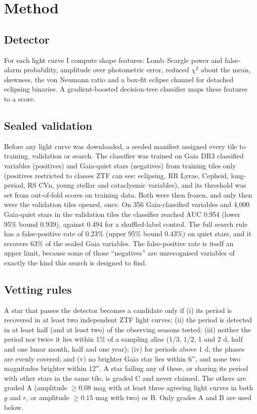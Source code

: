\documentclass[twocolumn]{searchchev_preprint}
\begin{document}
\section{Method}
\subsection{Detector}
For each light curve I compute shape features: Lomb--Scargle \citep{Lomb1976,Scargle1982} power and false-alarm
probability, amplitude over photometric error, reduced $\chi^2$ about the mean, skewness, the von Neumann ratio and a
box-fit eclipse channel for detached eclipsing binaries. A gradient-boosted decision-tree classifier maps these features
to a score.

\subsection{Sealed validation}
Before any light curve was downloaded, a seeded manifest assigned every tile to training, validation or search. The
classifier was trained on Gaia DR3 classified variables (positives) and Gaia-quiet stars (negatives) from training
tiles only (positives restricted to classes ZTF can see: eclipsing, RR Lyrae, Cepheid, long-period, RS CVn, young
stellar and cataclysmic variables), and its threshold was set from out-of-fold scores on training data. Both were then frozen, and only then
were the validation tiles opened, once. On 356 Gaia-classified variables and 4,000 Gaia-quiet stars in the validation
tiles the classifier reached AUC 0.954 (lower 95\% bound 0.939), against 0.494 for a shuffled-label control. The full
search rule has a false-positive rate of 0.23\% (upper 95\% bound 0.43\%) on quiet stars, and it recovers 63\% of the sealed Gaia variables. The false-positive rate is itself an upper limit,
because some of those ``negatives'' are unrecognised variables of exactly the kind this search is designed to find.

\subsection{Vetting rules}
A star that passes the detector becomes a candidate only if (i) its period is recovered in at least two independent ZTF
light curves; (ii) the period is detected in at least half (and at least two) of the observing seasons tested;
(iii) neither the period nor twice it lies within 1\% of a sampling alias (1/3, 1/2, 1 and 2 d, half and one lunar
month, half and one year); (iv) for periods above 1 d, the phases are evenly covered; and (v) no brighter Gaia star
lies within $6''$, and none two magnitudes brighter within $12''$. A star failing any of these, or sharing its period
with other stars in the same tile, is graded C and never claimed. The others are graded A (amplitude $\ge0.08$ mag
with at least three agreeing light curves in both $g$ and $r$, or amplitude $\ge0.15$ mag with two) or B. Only grades A
and B are used below.
\end{document}
